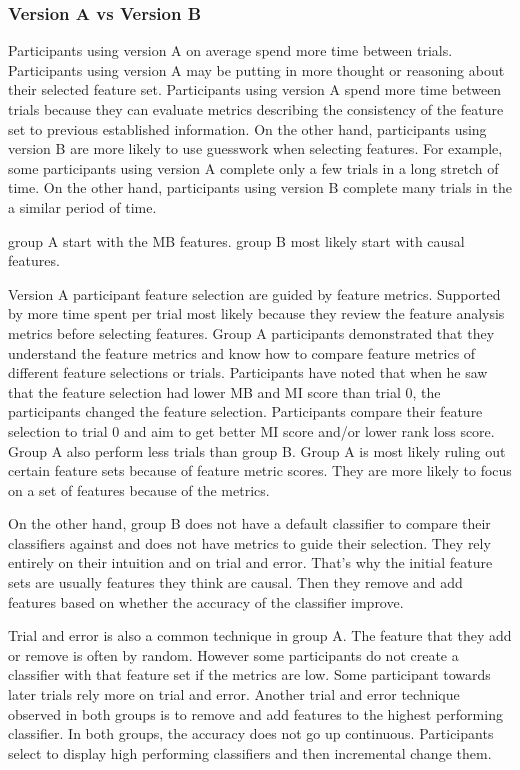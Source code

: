 \subsubsection { Version A vs Version B }
Participants using version A on average spend more time between trials. Participants using version A may be putting in more thought or reasoning about their selected feature set. Participants using version A spend more time between trials because they can evaluate metrics describing the consistency of the feature set to previous established information. On the other hand, participants using version B are more likely to use guesswork when selecting features. For example, some participants using version A complete only a few trials in a long stretch of time. On the other hand, participants using version B complete many trials in the a similar period of time.

group A start with the MB features. group B most likely start with causal features.

Version A participant feature selection are guided by feature metrics. Supported by more time spent per trial most likely because they review the feature analysis metrics before selecting features. Group A participants demonstrated that they understand the feature metrics and know how to compare feature metrics of different feature selections or trials. Participants have noted that when he saw that the feature selection had lower MB and MI score than trial 0, the participants changed the feature selection. Participants compare their feature selection to trial 0 and aim to get better MI score and/or lower rank loss score. Group A also perform less trials than group B. Group A is most likely ruling out certain feature sets because of feature metric scores. They are more likely to focus on a set of features because of the metrics.

On the other hand, group B does not have a default classifier to compare their classifiers against and does not have metrics to guide their selection. They rely entirely on their intuition and on trial and error. That's why the initial feature sets are usually features they think are causal. Then they remove and add features based on whether the accuracy of the classifier improve.

Trial and error is also a common technique in group A. The feature that they add or remove is often by random. However some participants do not create a classifier with that feature set if the metrics are low. Some participant towards later trials rely more on trial and error.
Another trial and error technique observed in both groups is to remove and add features to the highest performing classifier. In both groups, the accuracy does not go up continuous. Participants select to display high performing classifiers and then incremental change them.


